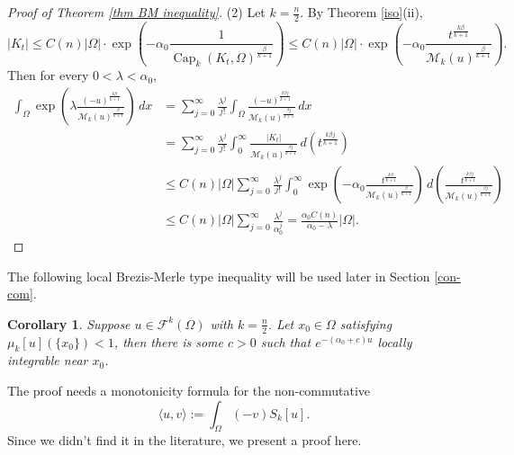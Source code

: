 \documentclass[11pt]{amsart}
\numberwithin{equation}{section}
\newtheorem{cor}[theorem]{Corollary}
\numberwithin{equation}{section}
\begin{document}
\begin{proof} [Proof of Theorem \ref{thm BM inequality}]
(2) Let $k=\frac{n}{2}$. By  Theorem \ref{iso}(ii), 
\[
|K_{t}|\leq C(n)|\Omega|\cdot\exp
\left(-\alpha_0\frac{1}{\operatorname{Cap}_{k}(K_t,\Omega)^{\frac{\beta}{k+1}}}\right)\leq C(n)|\Omega| \cdot\exp\left(-\alpha_0\frac{t^{\frac{k\beta}{k+1}}}{\mathcal M_k(u)^{\frac{\beta}{k+1}}}\right).
\]
Then for every $0<\lambda<\alpha_0$,
\begin{align*}
\int_{\Omega}\exp\left(\lambda\frac{(-u)^{\frac{k\beta}{k+1}}}{\mathcal M_k(u)^{\frac{\beta}{k+1}}}\right)\,dx
&=\sum_{j=0}^{\infty}\frac{\lambda^{j}}{j!}\int_{\Omega}\frac{(-u)^{\frac{k\beta  j}{k+1}}}{\mathcal M_k(u)^{\frac{\beta j}{k+1}}}\,dx\\
&=\sum_{j=0}^{\infty}\frac{\lambda^{j}}{j!}\int_{0}^{\infty}\frac{|K_{t}|}{\mathcal M_k(u)^{\frac{\beta j}{k+1}}}\,d(t^{\frac{k\beta j}{k+1}}) \\
&\leq C(n)|\Omega|\sum_{j=0}^{\infty}\frac{\lambda^{j}}{j!}\int_{0}^{\infty}\exp\left(-\alpha_0\frac{t^{\frac{k\beta}{k+1}}}{\mathcal M_k(u)^{\frac{\beta}{k+1}}}\right)\,d\left(\frac{t^{\frac{k\beta j}{k+1}}}{\mathcal M_k(u)^{\frac{\beta j}{k+1}}}\right) \\
&\leq C(n)|\Omega|\sum_{j=0}^{\infty}\frac{\lambda^{j}}{\alpha_0^{j}}=\frac{\alpha_0C(n)}{\alpha_0-\lambda}|\Omega|.
\end{align*}
\end{proof}

The following local Brezis-Merle type inequality will be used later in Section \ref{con-com}.
\begin{cor}\label{loc version of BM inequality}
	Suppose $u\in \mathcal F^k(\Omega)$ with $k=\frac{n}{2}$. Let $x_0\in \Omega$ satisfying $\mu_k[u](\{x_0\})<1$, then there is some $c>0$ such that $e^{-(\alpha_0+c) u} $ locally integrable near $x_0$.
\end{cor}

The proof needs a monotonicity formula for the non-commutative
\[\langle u, v\rangle:=\int_{\Omega} (-v) S_k[u].\]
Since we didn't find it in the literature, we present a proof here.
\end{document}
